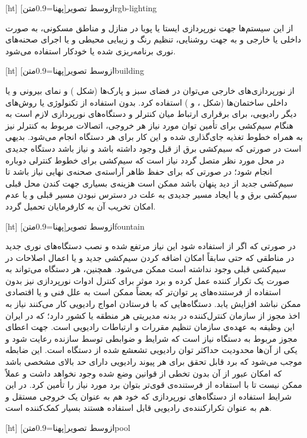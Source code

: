 
[ht]
‌ازوسط
‌تصویر[پهنا=0.9‌متن]{rgb-lighting}

از این سیستم‌ها جهت نورپردازی ایستا یا پویا در منازل و مناطق مسکونی، به صورت داخلی یا خارجی و به جهت روشنایی، تنظیم رنگ و زیبایی محیطی و یا اجرای صحنه‌های نوری برنامه‌ریزی شده یا خودکار استفاده می‌شود.

[ht]
‌ازوسط
‌تصویر[پهنا=0.9‌متن]{building}

از نورپردازی‌های خارجی می‌توان در فضای سبز  و پارک‌ها (شکل ) و نمای بیرونی و یا داخلی ساختمان‌ها (شکل ،  و ) استفاده کرد. بدون استفاده از تکنولوژی  یا روش‌های دیگر رادیویی، برای برقراری ارتباط میان کنترلر و دستگاه‌های نورپردازی لازم است به هنگام سیم‌کشی برای تأمین توان مورد نیاز هر خروجی، اتصالات مربوط به کنترلر نیز به همراه خطوط تغذیه جای‌گذاری شده و این کار برای هر دستگاه انجام می‌شود. بدیهی است در صورتی که سیم‌کشی برق از قبل وجود داشته باشد و نیاز باشد دستگاه جدیدی در محل مورد نظر متصل گردد نیاز است که سیم‌کشی برای خطوط کنترلی دوباره انجام شود؛ در صورتی که برای حفظ ظاهر آراسته‌ی صحنه‌ی نهایی نیاز باشد تا سیم‌کشی جدید از دید پنهان باشد ممکن است هزینه‌ی بسیاری جهت کندن محل قبلی سیم‌کشی برق و یا ایجاد مسیر جدیدی به علت در دسترس نبودن مسیر قبلی و یا عدم امکان تخریب آن به کارفرمایان تحمیل گردد.

[ht]
‌ازوسط
‌تصویر[پهنا=0.9‌متن]{fountain}

در صورتی که اگر از  استفاده شود این نیاز مرتفع شده و نصب دستگاه‌های نوری جدید در مناطقی که حتی سابقاً امکان اضافه کردن سیم‌کشی جدید و یا اعمال اصلاحات در سیم‌کشی قبلی وجود نداشته است ممکن می‌شود. همچنین، هر دستگاه می‌تواند به صورت یک تکرار کننده عمل کرده و برد موثر برای کنترل ادوات نورپردازی نیز بدون استفاده از فرستنده‌های پر توان‌تر که بعضاً ممکن است به علل فنی و یا اقتصادی ممکن نباشد افزایش یابد. دستگاه‌هایی که با فرستادن امواج رادیویی کار می‌کنند نیاز به اخذ مجوز از سازمان کنترل‌کننده در بدنه مدیریتی هر منطقه یا کشور دارد؛ که در ایران این وظیفه به عهده‌ی سازمان تنظیم مقررات و ارتباطات رادیویی است. جهت اعطای مجوز مربوط به دستگاه نیاز است که شرایط و ضوابطی توسط سازنده رعایت شود و یکی از آن‌ها محدودیت حداکثر توان رادیویی تشعشع شده از دستگاه است. این ضابطه موجب می‌شود که برد قابل تحقق برای هر پیوند رادیویی دارای حد بالای مشخصی باشد که امکان عبور از آن بدون تخطی از قوانین وضع شده وجود نخواهد داشت و عملاً ممکن نیست تا با استفاده از فرستنده‌ی قوی‌تر بتوان برد مورد نیاز را تأمین کرد. در این شرایط استفاده از دستگاه‌های نورپردازی که خود هم به عنوان یک خروجی مستقل و هم به عنوان تکرارکننده‌ی رادیویی قابل استفاده هستند بسیار کمک‌کننده است.

[ht]
‌ازوسط
‌تصویر[پهنا=0.9‌متن]{pool}

